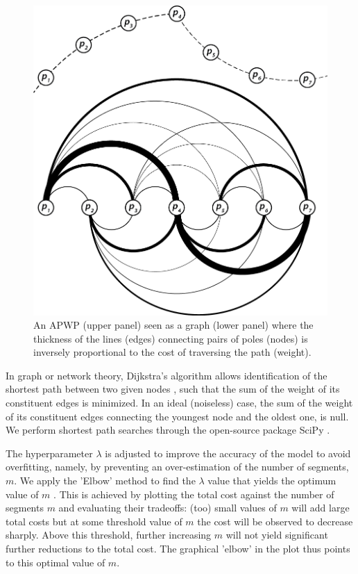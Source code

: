 \documentclass{article} %
\begin{document}
\begin{figure}
\begin{centering}
\includegraphics[scale=0.6]{graph.png}

\caption{\small An APWP (upper panel) seen as a graph (lower panel) where the thickness of the lines (edges) connecting pairs of poles (nodes) is inversely proportional to the cost of traversing the path (weight).}

\label{fig:graph}
\end{centering}
\end{figure}

In graph or network theory, Dijkstra's algorithm allows identification of the shortest path between two given nodes \citep{dijkstra1959note}, such that the sum of the weight of its constituent edges is minimized. In an ideal (noiseless) case, the sum of the weight of its constituent edges connecting the youngest node and the oldest one, is null. We perform shortest path searches through the open-source package SciPy \citep[scipy.sparse.csgraph.shortest\_path,][]{virtanen2020scipy}. 

The hyperparameter $\lambda$ is adjusted to improve the accuracy of the model to avoid overfitting, namely, by preventing an over-estimation of the number of segments, $m$. We apply the 'Elbow' method to find the $\lambda$ value that yields the optimum value of $m$  \citep{bholowalia2014ebk}. This is achieved by plotting the total cost against the number of segments $m$ and evaluating their tradeoffs: (too) small values of $m$ will add large total costs but at some threshold value of $m$ the cost will be observed to decrease sharply. Above this threshold, further increasing $m$ will not yield significant further reductions to the total cost. The graphical 'elbow' in the plot thus points to this optimal value of $m$.
\end{document}
